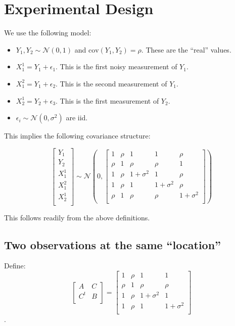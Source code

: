 \documentclass[paper=a4, fontsize=11pt]{scrartcl} %
\numberwithin{equation}{section} %
\numberwithin{figure}{section} %
\numberwithin{table}{section} %
\newcommand{\eps}{\epsilon}
\newcommand{\sig}{\sigma^2}
\newcommand{\nn}{\mathcal{N}}
\newcommand{\cov}{\text{cov}}
\begin{document}
 
\section{Experimental Design}

We use the following model:
\begin{itemize}
 \item $Y_1 , Y_2 \sim\nn (0,1)$ and $\cov(Y_1 , Y_2 )  = \rho$. These are the ``real'' values.
 \item $X_1^1 = Y_1 + \eps_1$. This is the first noisy measurement of $Y_1$.
 \item $X_1^2 = Y_1 + \eps_2$. This is the second measurement of $Y_1$.
 \item $X_2^1 = Y_2 + \eps_3$. This is the first measurement of $Y_2$.
 \item $\eps_i \sim \nn (0 , \sig)$ are iid.
\end{itemize}
This implies the following covariance structure:

\[
\begin{bmatrix}
 Y_1    \\
  Y_2   \\
  X_1^1 \\
  X_1^2 \\
  X_2^1 \\
\end{bmatrix}
\sim \nn \left ( 0 , 
\begin{bmatrix}   
1      &   \rho   &   1      &   1      & \rho    \\
\rho   &   1      &   \rho   &   \rho   & 1       \\ 
1      &   \rho   &   1+\sig &   1      & \rho    \\
1      &   \rho   &   1      &   1+\sig & \rho    \\
\rho   &   1      &   \rho   &   \rho   & 1+\sig  \\
\end{bmatrix}
\right )
\]

This follows readily from the above definitions. 

\subsection{Two observations at the same ``location''}
Define:
\[
\begin{bmatrix}
 A   & C    \\
 C^t & B    \\
\end{bmatrix}
= 
\begin{bmatrix}   
1      &   \rho   &   1      &   1        \\
\rho   &   1      &   \rho   &   \rho     \\ 
1      &   \rho   &   1+\sig &   1        \\
1      &   \rho   &   1      &   1+\sig   \\
\end{bmatrix}
\].
\end{document}
